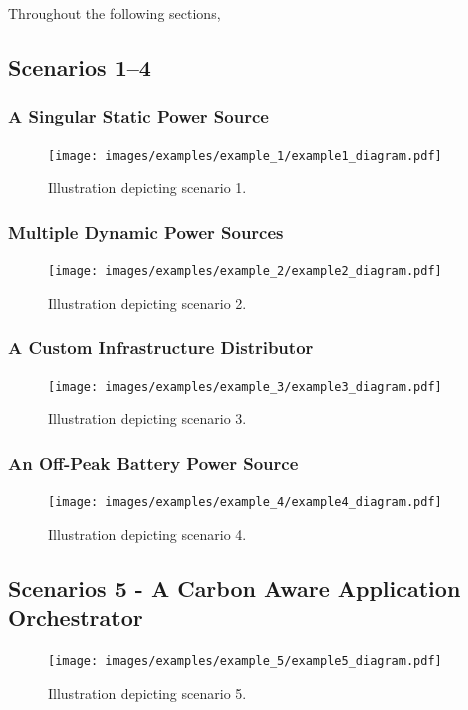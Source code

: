 \documentclass{l4proj}
\begin{document}
Throughout the following sections,
\subsection{Scenarios 1--4}\label{eval:subsec:small-scenarios}

\subsubsection{A Singular Static Power Source}
\begin{figure}[h]
    \centering
    \texttt{[image: images/examples/example\_1/example1\_diagram.pdf]}
    ~
    \caption{Illustration depicting scenario 1.}
    \label{fig:example1_diagram}
\end{figure}

\subsubsection{Multiple Dynamic Power Sources}\begin{figure}[h]
    \centering
    \texttt{[image: images/examples/example\_2/example2\_diagram.pdf]}
    ~
    \caption{Illustration depicting scenario 2.}
    \label{fig:example2_diagram}
\end{figure}

\subsubsection{A Custom Infrastructure Distributor}
\begin{figure}[h]
    \centering
    \texttt{[image: images/examples/example\_3/example3\_diagram.pdf]}
    ~
    \caption{Illustration depicting scenario 3.}
    \label{fig:example3_diagram}
\end{figure}

\subsubsection{An Off-Peak Battery Power Source}
\begin{figure}[h]
    \centering
    \texttt{[image: images/examples/example\_4/example4\_diagram.pdf]}
    ~
    \caption{Illustration depicting scenario 4.}
    \label{fig:example4_diagram}
\end{figure}

\subsection{Scenarios 5 - A Carbon Aware Application Orchestrator}\label{eval:subsec:scenario 5}
\begin{figure}[h]
    \centering
    \texttt{[image: images/examples/example\_5/example5\_diagram.pdf]}
    ~
    \caption{Illustration depicting scenario 5.}
    \label{fig:example5_diagram}
\end{figure}
\end{document}
